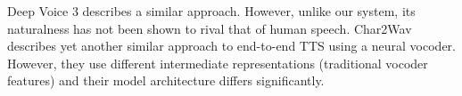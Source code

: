 Deep Voice 3 \cite{2017arXiv171007654P} describes a similar approach. However,
unlike our system, its naturalness has not been shown to rival that of
human speech.
%
Char2Wav \cite{Sotelo2017Char2wavES} describes yet another similar approach to
end-to-end TTS using a neural vocoder. However, they use different intermediate
representations (traditional vocoder features) and their model architecture
differs significantly.
